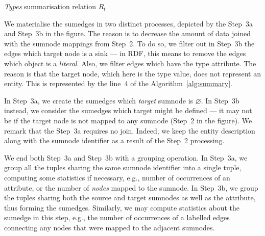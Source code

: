 \begin{algorithm}
	\DontPrintSemicolon
	\BlankLine
	\caption{\emph{Types} summarisation relation $R_t$}
	\label{alg:mapper-rt}
\end{algorithm}

\label{chap03:algo:edge-materialisation}

We materialise the sumedges in two distinct processes, depicted by the Step~3a and Step~3b in the figure. The reason is to decrease the amount of data joined with the sumnode mappings from Step~2. To do so, we filter out in Step~3b the edges which target node is a sink --- in RDF, this means to remove the edges which object is a \emph{literal}. Also, we filter edges which have the type attribute. The reason is that the target node, which here is the type value, does not represent an entity. This is represented by the line~4 of the Algorithm~\ref{alg:summary}.

In Step~3a, we create the sumedges which \emph{target} sumnode is $\varnothing$. In Step~3b instead, we consider the sumedges which target might be defined --- it may not be if the target node is not mapped to any sumnode (Step~2 in the figure). We remark that the Step~3a requires no join. Indeed, we keep the entity description along with the sumnode identifier as a result of the Step~2 processing.


We end both Step~3a and Step~3b with a grouping operation. In Step~3a, we group all the tuples sharing the same sumnode identifier into a single tuple, computing some statistics if necessary, e.g., number of occurrences of an attribute, or the number of \emph{nodes} mapped to the sumnode. In Step~3b, we group the tuples sharing both the source and target sumnodes as well as the attribute, thus forming the sumedges. Similarly, we may compute statistics about the sumedge in this step, e.g., the number of occurrences of a labelled edges connecting any nodes that were mapped to the adjacent sumnodes.

